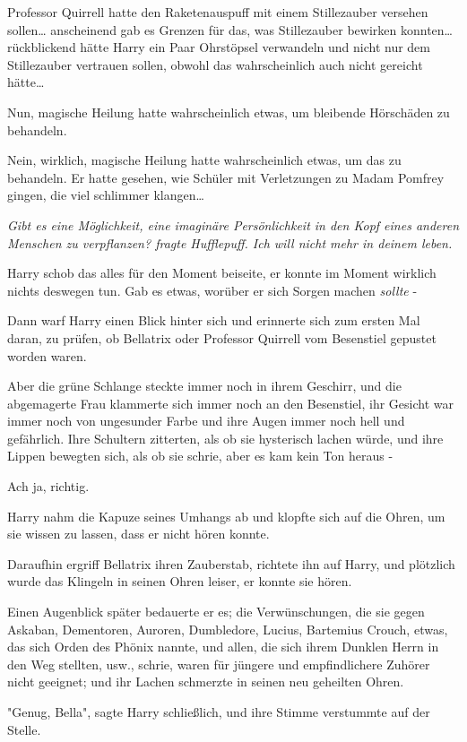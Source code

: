 {Professor Quirrell hatte den Raketenauspuff mit einem Stillezauber versehen sollen… anscheinend gab es Grenzen für das, was Stillezauber bewirken konnten… rückblickend hätte Harry ein Paar Ohrstöpsel verwandeln und nicht nur dem Stillezauber vertrauen sollen, obwohl das wahrscheinlich auch nicht gereicht hätte…

Nun, magische Heilung hatte wahrscheinlich etwas, um bleibende Hörschäden zu behandeln.

Nein, wirklich, magische Heilung hatte wahrscheinlich etwas, um das zu behandeln. Er hatte gesehen, wie Schüler mit Verletzungen zu Madam Pomfrey gingen, die viel schlimmer klangen…

\emph{\emph{Gibt es eine Möglichkeit, eine imaginäre Persönlichkeit in den Kopf eines anderen Menschen zu verpflanzen?} fragte Hufflepuff. \emph{Ich will nicht mehr in deinem leben.}}

Harry schob das alles für den Moment beiseite, er konnte im Moment wirklich nichts deswegen tun. Gab es etwas, worüber er sich Sorgen machen \emph{sollte} -

Dann warf Harry einen Blick hinter sich und erinnerte sich zum ersten Mal daran, zu prüfen, ob Bellatrix oder Professor Quirrell vom Besenstiel gepustet worden waren.

Aber die grüne Schlange steckte immer noch in ihrem Geschirr, und die abgemagerte Frau klammerte sich immer noch an den Besenstiel, ihr Gesicht war immer noch von ungesunder Farbe und ihre Augen immer noch hell und gefährlich. Ihre Schultern zitterten, als ob sie hysterisch lachen würde, und ihre Lippen bewegten sich, als ob sie schrie, aber es kam kein Ton heraus -

Ach ja, richtig.

Harry nahm die Kapuze seines Umhangs ab und klopfte sich auf die Ohren, um sie wissen zu lassen, dass er nicht hören konnte.

Daraufhin ergriff Bellatrix ihren Zauberstab, richtete ihn auf Harry, und plötzlich wurde das Klingeln in seinen Ohren leiser, er konnte sie hören.

Einen Augenblick später bedauerte er es; die Verwünschungen, die sie gegen Askaban, Dementoren, Auroren, Dumbledore, Lucius, Bartemius Crouch, etwas, das sich Orden des Phönix nannte, und allen, die sich ihrem Dunklen Herrn in den Weg stellten, usw., schrie, waren für jüngere und empfindlichere Zuhörer nicht geeignet; und ihr Lachen schmerzte in seinen neu geheilten Ohren.

"Genug, Bella", sagte Harry schließlich, und ihre Stimme verstummte auf der Stelle.

}
